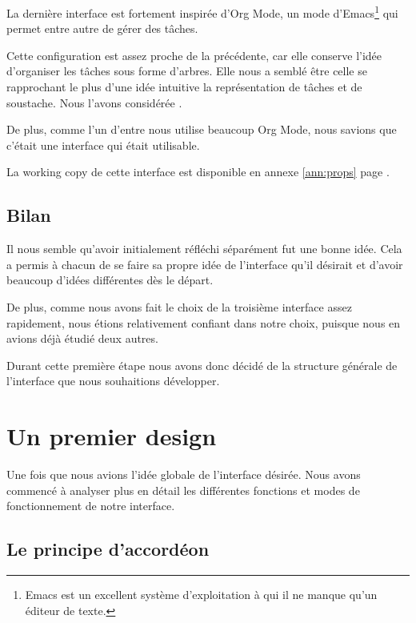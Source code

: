 \documentclass[11pt]{article}
\begin{document}
La dernière interface est fortement inspirée d'Org Mode, un mode
d'Emacs\footnote{Emacs est un excellent système d'exploitation à qui
  il ne manque qu'un éditeur de texte.} qui permet entre autre de
gérer des tâches.

Cette configuration est assez proche de la précédente, car elle
conserve l'idée d'organiser les tâches sous forme d'arbres. Elle nous
a semblé être celle se rapprochant le plus d'une idée intuitive la
représentation de tâches et de \gls{soustache}. Nous l'avons
considérée .

De plus, comme l'un d'entre nous utilise beaucoup Org Mode, nous
savions que c'était une interface qui était utilisable.

La working copy de cette interface est disponible en annexe \ref{ann:props} page \pageref{fig:sexy}.


\subsection{Bilan}

Il nous semble qu'avoir initialement réfléchi séparément fut une bonne
idée. Cela a permis à chacun de se faire sa propre idée de l'interface
qu'il désirait et d'avoir beaucoup d'idées différentes dès le départ.

De plus, comme nous avons fait le choix de la troisième interface assez
rapidement, nous étions relativement confiant dans notre choix,
puisque nous en avions déjà étudié deux autres.

Durant cette première étape nous avons donc décidé de la structure
générale de l'interface que nous souhaitions développer.


\section{Un premier design}
\label{sec:premierDesign}

Une fois que nous avions l'idée globale de l'interface désirée. Nous
avons commencé à analyser plus en détail les différentes fonctions et
modes de fonctionnement de notre interface.


\subsection{Le principe d'accordéon}
\label{sec:accordeon}
\end{document}
